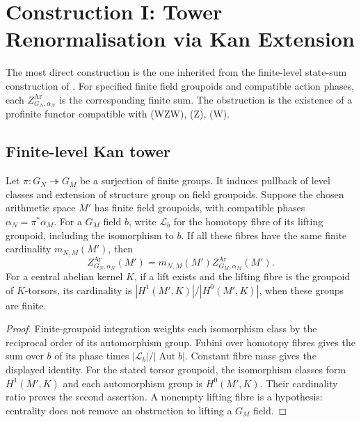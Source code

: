 \section{Construction I: Tower Renormalisation via Kan Extension}
\label{v4-arith:w10-a:construction-I}

The most direct construction is the one inherited from the finite-level
state-sum construction of
. For specified finite field groupoids and compatible action phases,
each $Z^{\mathrm{Ar}}_{G_N,\alpha_N}$ is the corresponding finite sum. The obstruction is the existence of a profinite
functor compatible with (WZW), (Z), (W).

\subsection{Finite-level Kan tower}
\label{v4-arith:w10-a:kan-tower}

\begin{lemma}
\label{v4-arith:w10-a:lem:reduction}
Let $\pi:G_N\twoheadrightarrow G_M$ be a surjection of finite groups.
It induces pullback of level classes and extension of structure group
on field groupoids. Suppose the chosen arithmetic space $M'$ has
finite field groupoids, with compatible phases
$\alpha_N=\pi^*\alpha_M$.
For a $G_M$ field $b$, write $\mathcal L_b$ for the homotopy fibre
of its lifting groupoid, including the isomorphism to $b$.
If all these fibres have the same finite cardinality $m_{N,M}(M')$,
then
\begin{equation}
\label{v4-arith:w10-a:eq:reduction-compat}
 Z^{\mathrm{Ar}}_{G_N,\alpha_N}(M')
 =m_{N,M}(M')Z^{\mathrm{Ar}}_{G_M,\alpha_M}(M').
\end{equation}
For a central abelian kernel $K$, if a lift exists and the lifting
fibre is the groupoid of $K$-torsors, its cardinality is
$|H^1(M',K)|/|H^0(M',K)|$, when these groups are finite.
\end{lemma}
\begin{proof}
Finite-groupoid integration weights each isomorphism class by the
reciprocal order of its automorphism group. Fubini over homotopy
fibres gives the sum over $b$ of its phase times
$|\mathcal L_b|/|\operatorname{Aut}b|$.
Constant fibre mass gives the displayed identity.
For the stated torsor groupoid, the isomorphism classes form
$H^1(M',K)$ and each automorphism group is $H^0(M',K)$.
Their cardinality ratio proves the second assertion.
A nonempty lifting fibre is a hypothesis: centrality does not
remove an obstruction to lifting a $G_M$ field.
\end{proof}

